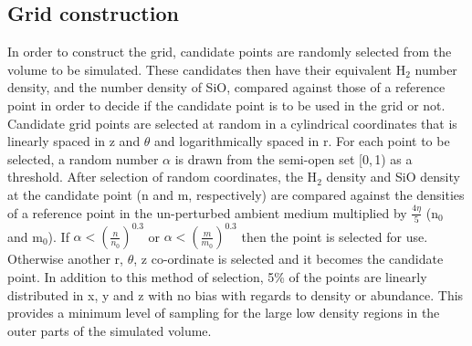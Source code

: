 \documentclass[useAMS,usenatbib,letters]{mn2e}
\begin{document}
\subsection{Grid construction} \label{subsec:gridding}
In order to construct the grid, candidate points are randomly selected from the volume to be simulated. These candidates then have their equivalent H$_2$ number density, and the number density of SiO, compared against those of a reference point in order to decide if the candidate point is to be used in the grid or not. Candidate grid points are selected at random in a cylindrical coordinates that is linearly spaced in z and $\theta$ and logarithmically spaced in r. For each point to be selected, a random number $\alpha$ is drawn from the semi-open set [0,$\,$1) as a threshold. After selection of random coordinates, the H$_2$ density and SiO density at the candidate point (n and m, respectively) are compared against the densities of a reference point in the un-perturbed ambient medium multiplied by $\frac{4\eta}{5}$ (n$_0$ and m$_0$). If $\alpha<\left( \frac{n}{n_0} \right)^{0.3}$ or $\alpha< \left( \frac{m}{m_0} \right)^{0.3}$ then the point is selected for use. Otherwise another r, $\theta$, z co-ordinate is selected and it becomes the candidate point. In addition to this method of selection, 5\% of the points are linearly distributed in x, y and z with no bias with regards to density or abundance. This provides a minimum level of sampling for the large low density regions in the outer parts of the simulated volume. %
\end{document}
